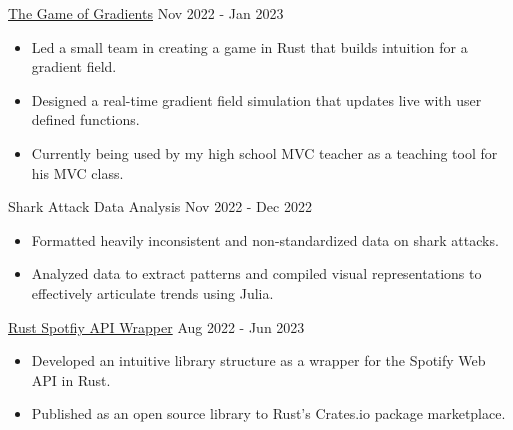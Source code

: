 \documentclass[9pt]{resume}
\begin{document}
    \begin{experiencelist}
        \experiencenocompany
            {\href{https://github.com/TheSharkhead2/The_Game_of_Gradients}{The Game of Gradients}}
            {Nov 2022 - Jan 2023}
            {\begin{itemize}[noitemsep, topsep=1pt] 
                \item Led a small team in creating a game in Rust that builds intuition for a gradient field.
                \item Designed a real-time gradient field simulation that updates live with user defined functions. 
                \item Currently being used by my high school MVC teacher as a teaching tool for his MVC class. 
            \end{itemize}}
        \experiencenocompany 
            {Shark Attack Data Analysis}
            {Nov 2022 - Dec 2022}
            {\begin{itemize}[noitemsep, topsep=1pt]
                \item Formatted heavily inconsistent and non-standardized data on shark attacks.
                \item Analyzed data to extract patterns and compiled visual representations to effectively articulate trends using Julia. 
            \end{itemize}}
        \experiencenocompany
            {\href{https://github.com/TheSharkhead2/spotify.rs}{Rust Spotfiy API Wrapper}}
            {Aug 2022 - Jun 2023}
            {\begin{itemize}[noitemsep, topsep=1pt]
                \item Developed an intuitive library structure as a wrapper for the Spotify Web API in Rust. 
                \item Published as an open source library to Rust's Crates.io package marketplace.
            \end{itemize}}

\end{experiencelist}
\end{document}

